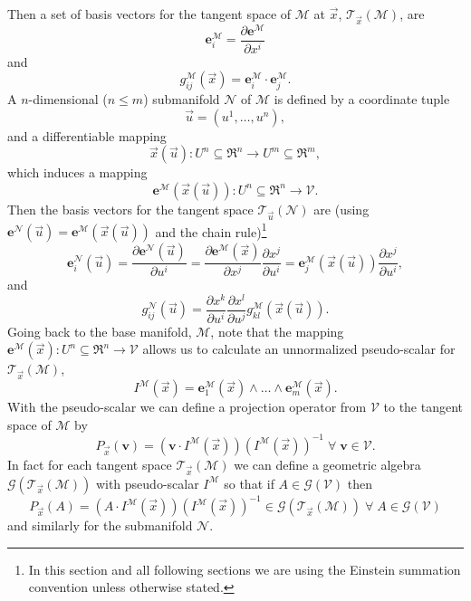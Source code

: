 \documentclass[12pt]{report}
\newcommand{\bm}[1]{\boldsymbol{#1}}
\newcommand{\bfrac}[2]{\displaystyle\frac{#1}{#2}}
\newcommand{\lp}{\left (}
\newcommand{\rp}{\right )}
\newcommand{\pdiff}[2]{\bfrac{\partial {#1}}{\partial {#2}}}
\newcommand{\W}{\wedge}
\newcommand{\f}[2]{{#1}\lp {#2} \rp}
\newcommand{\paren}[1]{\lp {#1} \rp}
\newcommand{\be}{\begin{equation}}
\newcommand{\ee}{\end{equation}}
\newcommand{\eb}{\bm{e}}
\newcommand{\Tn}[2]{\f{\mathcal{T}_{#2}}{#1}}
\begin{document}
Then a set of basis vectors for the tangent space of $\mathcal{M}$ at $\vec{x}$, $\Tn{\mathcal{M}}{\vec{x}}$, are
\be
    \bm{e}_{i}^{\mathcal{M}} = \pdiff{\bm{e}^{\mathcal{M}}}{x^{i}}
\ee
and
\be
    \f{g_{ij}^{\mathcal{M}}}{\vec{x}} = \bm{e}_{i}^{\mathcal{M}}\cdot\bm{e}_{j}^{\mathcal{M}}.
\ee
A $n$-dimensional ($n\le m$) submanifold $\mathcal{N}$ of $\mathcal{M}$ is defined by a coordinate tuple
\be
    \vec{u} = \paren{u^{1},\dots,u^{n}},
\ee
and a differentiable mapping
\be\label{eq_79}
    \f{\vec{x}}{\vec{u}}\colon U^{n}\subseteq\Re^{n}\rightarrow U^{m}\subseteq\Re^{m},
\ee
which induces a mapping
\be
    \f{\bm{e}^{\mathcal{M}}}{\f{\vec{x}}{\vec{u}}}\colon U^{n}\subseteq\Re^{n}\rightarrow \mathcal{V}.
\ee
Then the basis vectors for the tangent space $\Tn{\mathcal{N}}{\vec{u}}$ are
(using $\f{\eb^{\mathcal{N}}}{\vec{u}} = \f{\eb^{\mathcal{M}}}{\f{\vec{x}}{\vec{u}}}$ and the chain rule)\footnote{In
 this section and all following sections we are using the Einstein summation convention unless otherwise stated.}
\be
    \f{\bm{e}_{i}^{\mathcal{N}}}{\vec{u}} = \pdiff{\f{\bm{e}^{\mathcal{N}}}{\vec{u}}}{u^{i}}
                                              = \pdiff{\f{\bm{e}^{\mathcal{M}}}{\vec{x}}}{x^{j}}\pdiff{x^{j}}{u^{i}}
                                              = \f{\bm{e}_{j}^{\mathcal{M}}}{\f{\vec{x}}{\vec{u}}}\pdiff{x^{j}}{u^{i}},
\ee
and
\be\label{eq_81}
    \f{g_{ij}^{\mathcal{N}}}{\vec{u}} = \pdiff{x^{k}}{u^{i}}\pdiff{x^{l}}{u^{j}}
                                            \f{g_{kl}^{\mathcal{M}}}{\f{\vec{x}}{\vec{u}}}.
\ee
Going back to the base manifold, $\mathcal{M}$, note that the mapping
$\f{\bm{e}^{\mathcal{M}}}{\vec{x}}\colon U^{n}\subseteq\Re^{n}\rightarrow \mathcal{V}$ allows us to calculate an unnormalized pseudo-scalar
for $\Tn{\mathcal{M}}{\vec{x}}$,
\be
    \f{I^{\mathcal{M}}}{\vec{x}} = \f{\bm{e}_{1}^{\mathcal{M}}}{\vec{x}}
                                       \W\dots\W\f{\bm{e}_{m}^{\mathcal{M}}}{\vec{x}}.
\ee
With the pseudo-scalar we can define a projection operator from $\mathcal{V}$
to the tangent space of $\mathcal{M}$ by
\be
    \f{P_{\vec{x}}}{\bm{v}} = (\bm{v}\cdot \f{I^{\mathcal{M}}}{\vec{x}})
                              \paren{\f{I^{\mathcal{M}}}{\vec{x}}}^{-1} \;\forall\; \bm{v}\in\mathcal{V}.
\ee
In fact for each tangent space $\Tn{\mathcal{M}}{\vec{x}}$ we can define a geometric algebra
$\f{\mathcal{G}}{\Tn{\mathcal{M}}{\vec{x}}}$ with pseudo-scalar $I^{\mathcal{M}}$ so that if
$A \in \f{\mathcal{G}}{\mathcal{V}}$ then
\be
    \f{P_{\vec{x}}}{A} = \paren{A\cdot \f{I^{\mathcal{M}}}{\vec{x}}}
                         \paren{\f{I^{\mathcal{M}}}{\vec{x}}}^{-1}
                         \in \f{\mathcal{G}}{\Tn{\mathcal{M}}{\vec{x}}}\;\forall\;
                         A \in \f{\mathcal{G}}{\mathcal{V}}
\ee
and similarly for the submanifold $\mathcal{N}$.
\end{document}
